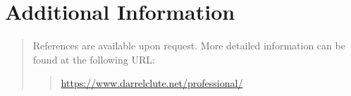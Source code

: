 \section*{Additional Information}
\begin{quote}
References are available upon request.  More detailed information can be found at the following URL:
\begin{quote}
\url{https://www.darrelclute.net/professional/}
\end{quote}
\end{quote}
